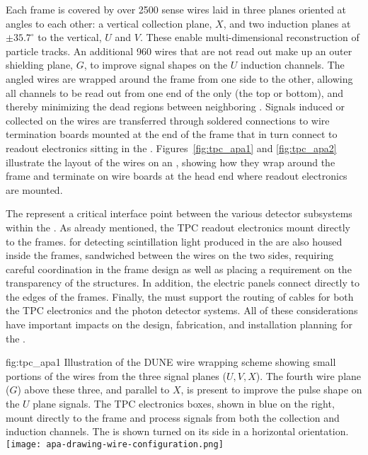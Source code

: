 Each  frame is covered by over \num{2500} sense wires laid in three planes  oriented at angles to each other: a vertical collection plane, $X$, and two induction planes at $\pm35.7^\circ$ to the vertical, $U$ and $V$. These enable multi-dimensional reconstruction of particle tracks.  An additional \num{960} wires that are not read out make up an outer shielding plane, $G$, to improve signal shapes on the $U$ induction channels.  The angled wires are wrapped around the frame from one side to the other, allowing all channels to be read out from one end of the  only (the top or bottom), and thereby minimizing the dead regions between neighboring . Signals induced or collected on the wires are transferred through soldered connections to wire termination boards mounted at the end of the  frame that in turn connect to  readout electronics sitting in the \lar.  Figures~\ref{fig:tpc_apa1} and \ref{fig:tpc_apa2} illustrate the layout of the wires on an , showing how they wrap around the frame and terminate on wire boards at the head end where readout electronics are mounted.

The  represent a critical interface point between the various detector subsystems within the .  As already mentioned, the TPC readout electronics mount directly to the  frames.   for detecting scintillation light produced in the \lar are also housed inside the frames, sandwiched between the wires on the two sides, requiring careful coordination in the frame design as well as placing a requirement on the transparency of the  structures.  In addition, the electric  panels connect directly to the edges of the  frames.  Finally, the  must support the routing of cables for both the TPC electronics and the photon detector systems. All of these considerations have important impacts on the design, fabrication, and installation planning for the .   

\begin{dunefigure}{fig:tpc_apa1}
{Illustration of the DUNE  wire wrapping scheme showing small portions of the wires from the three signal planes ($U,V,X$). The fourth wire plane ($G$) above these three, and parallel to $X$, is present to improve the pulse shape on the $U$ plane signals. The TPC electronics boxes, shown in blue on the right, mount directly to the frame and process signals from both the collection and induction channels. The  is shown turned on its side in a horizontal orientation.} 
\texttt{[image: apa-drawing-wire-configuration.png]} 
\end{dunefigure} 

